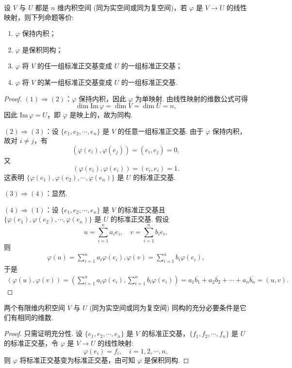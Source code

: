\documentclass[../../main.tex]{subfiles}
\begin{document}
\begin{theorem}\label{theorem:保积同构的等价命题}
设 $V$ 与 $U$ 都是 $n$ 维内积空间 (同为实空间或同为复空间)，若 $\varphi$ 是 $V \to U$ 的线性映射，则下列命题等价:
\begin{enumerate}[(1)]
\item $\varphi$ 保持内积；

\item  $\varphi$ 是保积同构；

\item  $\varphi$ 将 $V$ 的任一组标准正交基变成 $U$ 的一组标准正交基；

\item $\varphi$ 将 $V$ 的某一组标准正交基变成 $U$ 的一组标准正交基.
\end{enumerate}
\end{theorem}
\begin{proof}
$(1) \Rightarrow (2)$：$\varphi$ 保持内积，因此 $\varphi$ 为单映射. 由线性映射的维数公式可得
\[
\dim \text{Im}\,\varphi = \dim V = \dim U = n,
\]
因此 $\text{Im}\,\varphi = U$，即 $\varphi$ 是映上的，故为同构.

$(2) \Rightarrow (3)$：设 $\{e_1,e_2,\cdots,e_n\}$ 是 $V$ 的任意一组标准正交基. 由于 $\varphi$ 保持内积，故对 $i \neq j$，有
\[
(\varphi(e_i),\varphi(e_j)) = (e_i,e_j) = 0,
\]
又
\[
(\varphi(e_i),\varphi(e_i)) = (e_i,e_i) = 1.
\]
这表明 $\{\varphi(e_1),\varphi(e_2),\cdots,\varphi(e_n)\}$ 是 $U$ 的标准正交基.

$(3) \Rightarrow (4)$：显然.

$(4) \Rightarrow (1)$：设 $\{e_1,e_2,\cdots,e_n\}$ 是 $V$ 的标准正交基且 $\{\varphi(e_1),\varphi(e_2),\cdots,\varphi(e_n)\}$ 是 $U$ 的标准正交基. 假设
\[
u = \sum_{i = 1}^{n}a_ie_i,\quad v = \sum_{i = 1}^{n}b_ie_i,
\]
则
\begin{align*}
\varphi (u)=\sum_{i=1}^n{a_i\varphi (e_i),\varphi (v)=\sum_{i=1}^n{b_i\varphi (e_i),}}
\end{align*}
于是
\begin{align*}
(\varphi (u),\varphi (v))=\left( \sum_{i=1}^n{a_i\varphi (e_i),\sum_{i=1}^n{b_i\varphi (e_i)}} \right) =a_1\overline{b_1}+a_2\overline{b_2}+\cdots +a_n\overline{b_n}=(u,v).
\end{align*}

\end{proof}

\begin{corollary}\label{corollary:有限维内积空间同构的充要条件}
两个有限维内积空间 $V$ 与 $U$ (同为实空间或同为复空间) 同构的充分必要条件是它们有相同的维数.
\end{corollary}
\begin{proof}
只需证明充分性. 设 $\{e_1,e_2,\cdots,e_n\}$ 是 $V$ 的标准正交基，$\{f_1,f_2,\cdots,f_n\}$ 是 $U$ 的标准正交基，令 $\varphi$ 是 $V \to U$ 的线性映射:
\[
\varphi(e_i) = f_i,\quad i = 1,2,\cdots,n,
\]
则 $\varphi$ 将标准正交基变为标准正交基，由可知 $\varphi$ 是保积同构.

\end{proof}
\end{document}
